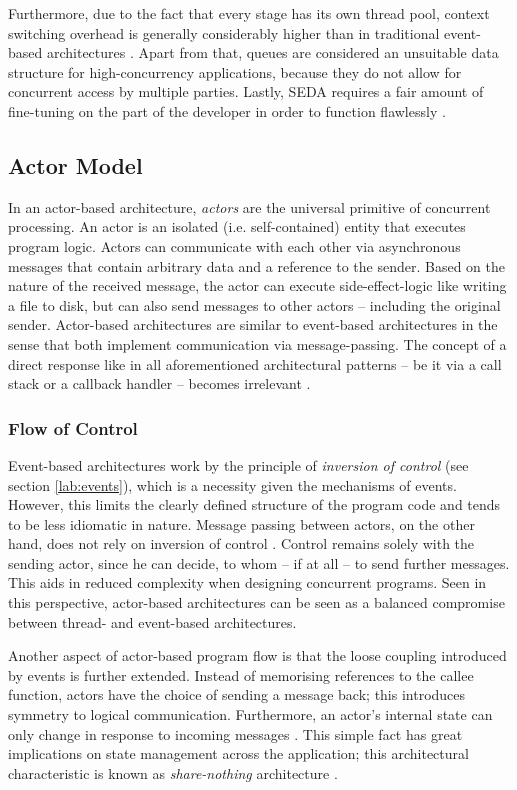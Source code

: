 Furthermore, due to the fact that every stage has its own thread pool, context switching overhead is generally considerably higher than in traditional event-based architectures \cite{seda}. Apart from that, queues are considered an unsuitable data structure for high-concurrency applications, because they do not allow for concurrent access by multiple parties. Lastly, SEDA requires a fair amount of fine-tuning on the part of the developer in order to function flawlessly \cite{event-architecture}.

\subsection{Actor Model}
\label{lab:actormodel}
In an actor-based architecture, \textit{actors} are the universal primitive of concurrent processing. An actor is an isolated (i.e. self-contained) entity that executes program logic. Actors can communicate with each other via asynchronous messages that contain arbitrary data and a reference to the sender. Based on the nature of the received message, the actor can execute side-effect-logic like writing a file to disk, but can also send messages to other actors -- including the original sender. Actor-based architectures are similar to event-based architectures in the sense that both implement communication via message-passing. The concept of a direct response like in all aforementioned architectural patterns -- be it via a call stack or a callback handler -- becomes irrelevant \cite{Haller2006}. 

\subsubsection*{Flow of Control}
Event-based architectures work by the principle of \textit{inversion of control} (see section \ref{lab:events}), which is a necessity given the mechanisms of events. However, this limits the clearly defined structure of the program code and tends to be less idiomatic in nature. Message passing between actors, on the other hand, does not rely on inversion of control \cite{Haller2006}. Control remains solely with the sending actor, since he can decide, to whom -- if at all -- to send further messages. This aids in reduced complexity when designing concurrent programs. Seen in this perspective, actor-based architectures can be seen as a balanced compromise between thread- and event-based architectures.

Another aspect of actor-based program flow is that the loose coupling introduced by events is further extended. Instead of memorising references to the callee function, actors have the choice of sending a message back; this introduces symmetry to logical communication. Furthermore, an actor's internal state can only change in response to incoming messages \cite[p. 38]{Haller2011}. This simple fact has great implications on state management across the application; this architectural characteristic is known as \textit{share-nothing} architecture \cite[p. 3]{Bonetta}.

